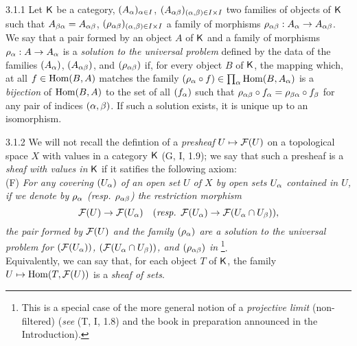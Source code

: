 \documentclass[../main.tex]{subfiles}
\begin{document}
\begin{env}{3.1.1}
Let $\mathsf{K}$ be a category, $(A_\alpha)_{\alpha\in I}$,
$(A_{\alpha\beta})_{(\alpha,\beta)\in I\times I}$ two families of objects
of $\mathsf{K}$ such that $A_{\beta\alpha}=A_{\alpha\beta}$,
$(\rho_{\alpha\beta})_{(\alpha,\beta)\in I\times I}$ a family of morphisms
$\rho_{\alpha\beta}:A_\alpha\to A_{\alpha\beta}$. We say that a pair formed by
an object $A$ of $\mathsf{K}$ and a family of morphisms $\rho_\alpha:A\to A_\alpha$ 
is a \emph{solution to the universal problem} defined by the data of the families
$(A_\alpha)$, $(A_{\alpha\beta})$, and $(\rho_{\alpha\beta})$ if, for every object $B$
of $\mathsf{K}$, the mapping which, at all $f\in\operatorname{Hom}(B,A)$ matches the
family $(\rho_\alpha\circ f)\in\prod_\alpha\operatorname{Hom}(B,A_\alpha)$ is a \emph{bijection}
of $\operatorname{Hom}(B,A)$ to the set of all $(f_\alpha)$ such that
$\rho_{\alpha\beta}\circ f_\alpha=\rho_{\beta\alpha}\circ f_\beta$ for any pair of
indices $(\alpha,\beta)$. If such a solution exists, it is unique up to an isomorphism.
\end{env}

\begin{env}{3.1.2}
We will not recall the defintion of a \emph{presheaf} $U\mapsto\mathcal{F}(U)$ on a
topological space $X$ with values in a category $\mathsf{K}$ (G, I, 1.9); we say that
such a presheaf is a \emph{sheaf with values in} $\mathsf{K}$ if it satifies the following
axiom:\\

(F) \emph{For any covering $(U_\alpha)$ of an open set $U$ of $X$ by open sets
   $U_\alpha$ contained in $U$, if we denote by $\rho_\alpha$ (resp. $\rho_{\alpha\beta}$) the
   restriction morphism}
   \[
     \mathcal{F}(U)\to\mathcal{F}(U_\alpha)\quad(\text{\emph{resp. }}\mathcal{F}(U_\alpha)\to\mathcal{F}(U_\alpha\cap U_\beta)),
   \]
   \emph{the pair formed by $\mathcal{F}(U)$ and the family $(\rho_\alpha)$ are a solution to
   the universal problem for $(\mathcal{F}(U_\alpha))$, $(\mathcal{F}(U_\alpha\cap U_\beta))$, and $(\rho_{\alpha\beta})$
   in} \footnote{This is a special case of the more general notion of a
   \emph{projective limit} (non-filtered) (\emph{see} (T, I, 1.8) and the book in
   preparation announced in the Introduction).}.\\

Equivalently, we can say that, for each object $T$ of $\mathsf{K}$, the family
$U\mapsto\operatorname{Hom}(T,\mathcal{F}(U))$ is a \emph{sheaf of sets}.
\end{env}
\end{document}
